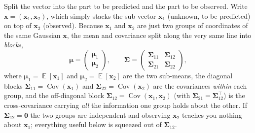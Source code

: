 \documentclass[11pt]{article}
\numberwithin{equation}{section}
\theoremstyle{plain}
\theoremstyle{definition}
\theoremstyle{remark}
\DeclareMathOperator{\E}{\mathbb{E}}
\DeclareMathOperator{\Cov}{Cov}
\newcommand{\x}{\bm{x}}
\newcommand{\bmu}{\bm{\mu}}
\newcommand{\bSigma}{\bm{\Sigma}}
\newcommand{\T}{\top}
\begin{document}
Split the vector into the part to be predicted and the part to be observed. Write $\x = (\x_1, \x_2)$, which simply stacks the sub-vector $\x_1$ (unknown, to be predicted) on top of $\x_2$ (observed). Because $\x_1$ and $\x_2$ are just two groups of coordinates of the same Gaussian $\x$, the mean and covariance split along the very same line into \emph{blocks},
\[
\bmu = \begin{pmatrix} \bmu_1 \\ \bmu_2 \end{pmatrix},
\qquad
\bSigma = \begin{pmatrix} \bSigma_{11} & \bSigma_{12} \\ \bSigma_{21} & \bSigma_{22} \end{pmatrix},
\]
where $\bmu_1 = \E[\x_1]$ and $\bmu_2 = \E[\x_2]$ are the two sub-means, the diagonal blocks $\bSigma_{11} = \Cov(\x_1)$ and $\bSigma_{22} = \Cov(\x_2)$ are the covariances \emph{within} each group, and the off-diagonal block $\bSigma_{12} = \Cov(\x_1, \x_2)$ (with $\bSigma_{21} = \bSigma_{12}^\T$) is the cross-covariance carrying \emph{all} the information one group holds about the other. If $\bSigma_{12} = \bm{0}$ the two groups are independent and observing $\x_2$ teaches you nothing about $\x_1$; everything useful below is squeezed out of $\bSigma_{12}$.
\end{document}
